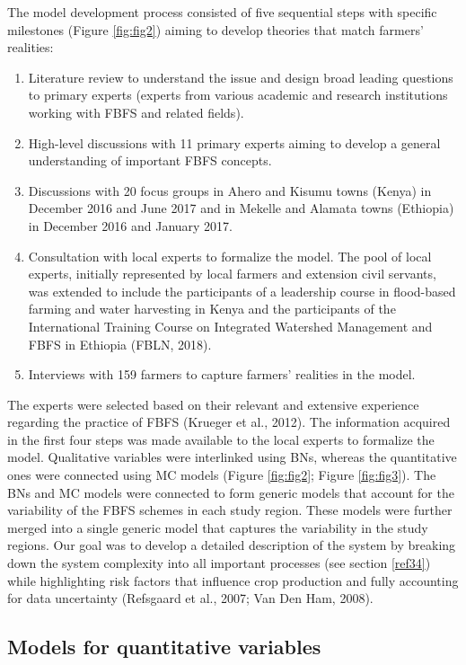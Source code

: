 \documentclass[]{elsarticle} %
\begin{document}
The model development process consisted of five sequential steps with specific milestones (Figure \ref{fig:fig2}) aiming to develop theories that match farmers' realities:

\begin{enumerate}
\def\labelenumi{\arabic{enumi}.}
\item
  Literature review to understand the issue and design broad leading questions to primary experts (experts from various academic and research institutions working with FBFS and related fields).
\item
  High-level discussions with 11 primary experts aiming to develop a general understanding of important FBFS concepts.
\item
  Discussions with 20 focus groups in Ahero and Kisumu towns (Kenya) in December 2016 and June 2017 and in Mekelle and Alamata towns (Ethiopia) in December 2016 and January 2017.
\item
  Consultation with local experts to formalize the model. The pool of local experts, initially represented by local farmers and extension civil servants, was extended to include the participants of a leadership course in flood-based farming and water harvesting in Kenya and the participants of the International Training Course on Integrated Watershed Management and FBFS in Ethiopia (FBLN, 2018).
\item
  Interviews with 159 farmers to capture farmers' realities in the model.
\end{enumerate}

The experts were selected based on their relevant and extensive experience regarding the practice of FBFS (Krueger et al., 2012). The information acquired in the first four steps was made available to the local experts to formalize the model. Qualitative variables were interlinked using BNs, whereas the quantitative ones were connected using MC models (Figure \ref{fig:fig2}; Figure \ref{fig:fig3}). The BNs and MC models were connected to form generic models that account for the variability of the FBFS schemes in each study region. These models were further merged into a single generic model that captures the variability in the study regions. Our goal was to develop a detailed description of the system by breaking down the system complexity into all important processes (see section \ref{ref34}) while highlighting risk factors that influence crop production and fully accounting for data uncertainty (Refsgaard et al., 2007; Van Den Ham, 2008).

\hypertarget{ref32}{%
\subsection{Models for quantitative variables}\label{ref32}}
\end{document}
